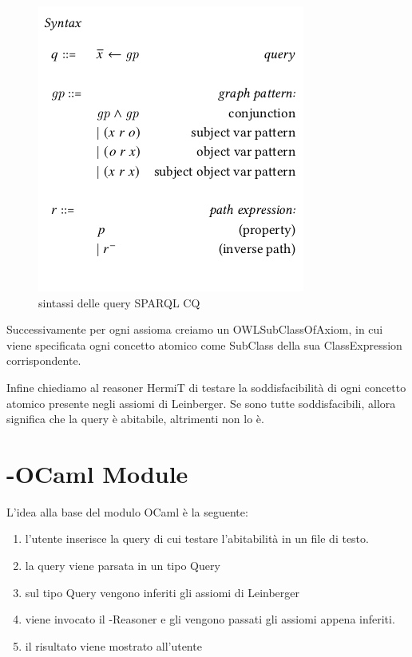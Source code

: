         \begin{figure}
            \centering
            \includegraphics[width=\textwidth]{pictures/leinbergSyntax.png}
            \caption{sintassi delle query SPARQL CQ}
            \label{fig:declarationCode}
        \end{figure}
                
        Successivamente per ogni assioma creiamo un OWLSubClassOfAxiom, in cui viene specificata ogni concetto atomico come SubClass della sua ClassExpression corrispondente. 

        Infine chiediamo al reasoner HermiT di testare la soddisfacibilità di ogni concetto atomico presente negli assiomi di Leinberger. Se sono tutte soddisfacibili, allora significa che la query è abitabile, altrimenti non lo è.

        \section{-OCaml Module}
        L'idea alla base del modulo OCaml è la seguente: 
            \begin{enumerate}
                \item l'utente inserisce la query di cui testare l'abitabilità in un file di testo. 
                \item la query viene parsata in un tipo Query
                \item sul tipo Query vengono inferiti gli assiomi di Leinberger
                \item viene invocato il -Reasoner e gli vengono passati gli assiomi appena inferiti.
                \item il risultato viene mostrato all'utente
            \end{enumerate}

